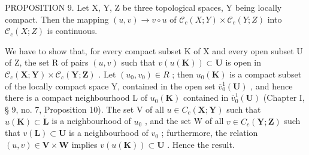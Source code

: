 PROPOSITION 9. Let X, Y, Z be three topological spaces, Y being locally compact. Then the mapping \((u, v) \to v \circ u\) of \(\mathcal{C}_c(X; Y) \times \mathcal{C}_c(Y; Z)\) into \(\mathcal{C}_c(X; Z)\) is continuous.

We have to show that, for every compact subset K of X and every open subset U of Z, the set R of pairs \((u, v)\) such that \(v(u(\mathbf{K})) \subset \mathbf{U}\) is open in \(\mathcal{C}_{c}(\mathbf{X}; \mathbf{Y}) \times \mathcal{C}_{c}(\mathbf{Y}; \mathbf{Z})\) . Let \((u_{0}, v_{0}) \in R\) ; then \(u_{0}(\mathbf{K})\) is a compact subset of the locally compact space Y, contained in the open set \(\overline{v}_{0}^{1}(\mathbf{U})\) , and hence there is a compact neighbourhood L of \(u_{0}(\mathbf{K})\) contained in \(\overline{v}_{0}^{1}(\mathbf{U})\) (Chapter I, § 9, no. 7, Proposition 10). The set V of all \(u \in C_{c}(\mathbf{X}; \mathbf{Y})\) such that \(u(\mathbf{K}) \subset \mathring{\mathbf{L}}\) is a neighbourhood of \(u_{0}\) , and the set W of all \(v \in C_{c}(\mathbf{Y}; \mathbf{Z})\) such that \(v(\mathbf{L}) \subset \mathbf{U}\) is a neighbourhood of \(v_{0}\) ; furthermore, the relation \((u, v) \in \mathbf{V} \times \mathbf{W}\) implies \(v(u(\mathbf{K})) \subset \mathbf{U}\) . Hence the result.

